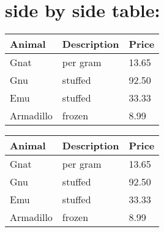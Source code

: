 \documentclass{book}
\begin{document}
\section{side by side table:}
\begin{table}[!hbt]
	\centering
	\begin{tabular}{|l|l|l|}
		\hline
		\textbf{Animal} & \textbf{Description} & \textbf{Price} \\
		\hline
		Gnat            & per gram             & 13.65          \\
		\hline
		Gnu             & stuffed              & 92.50          \\
		\hline
		Emu             & stuffed              & 33.33          \\
		\hline
		Armadillo       & frozen               & 8.99           \\
		\hline
	\end{tabular}
	\hfill
	\begin{tabular}{|l|l|l|}
		\hline
		\textbf{Animal} & \textbf{Description} & \textbf{Price} \\
		\hline
		Gnat            & per gram             & 13.65          \\
		\hline
		Gnu             & stuffed              & 92.50          \\
		\hline
		Emu             & stuffed              & 33.33          \\
		\hline
		Armadillo       & frozen               & 8.99           \\
		\hline
	\end{tabular}
\end{table}
\end{document}
